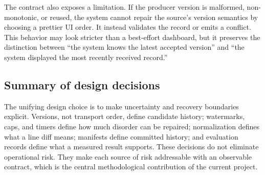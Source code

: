 The contract also exposes a limitation. If the producer version is malformed, non-monotonic, or reused, the system cannot repair the source's version semantics by choosing a prettier UI order. It instead validates the record or emits a conflict. This behavior may look stricter than a best-effort dashboard, but it preserves the distinction between ``the system knows the latest accepted version'' and ``the system displayed the most recently received record.''

\subsection{Summary of design decisions}

The unifying design choice is to make uncertainty and recovery boundaries explicit. Versions, not transport order, define candidate history; watermarks, caps, and timers define how much disorder can be repaired; normalization defines what a line diff means; manifests define committed history; and evaluation records define what a measured result supports. These decisions do not eliminate operational risk. They make each source of risk addressable with an observable contract, which is the central methodological contribution of the current project.
